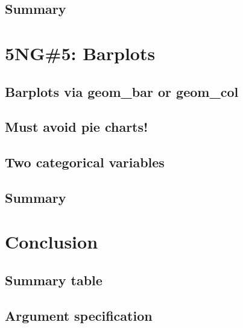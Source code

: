 \documentclass[
  12pt, krantz2,
]{krantz}
\begin{document}
\hypertarget{summary-3}{%
\subsection{Summary}\label{summary-3}}

\hypertarget{geombar}{%
\section{5NG\#5: Barplots}\label{geombar}}

\hypertarget{barplots-via-geom_bar-or-geom_col}{%
\subsection{Barplots via geom\_bar or geom\_col}\label{barplots-via-geom_bar-or-geom_col}}

\hypertarget{must-avoid-pie-charts}{%
\subsection{Must avoid pie charts!}\label{must-avoid-pie-charts}}

\hypertarget{two-categ-barplot}{%
\subsection{Two categorical variables}\label{two-categ-barplot}}

\hypertarget{summary-4}{%
\subsection{Summary}\label{summary-4}}

\hypertarget{conclusion-1}{%
\section{Conclusion}\label{conclusion-1}}

\hypertarget{summary-table}{%
\subsection{Summary table}\label{summary-table}}

\hypertarget{argument-specification}{%
\subsection{Argument specification}\label{argument-specification}}
\end{document}
